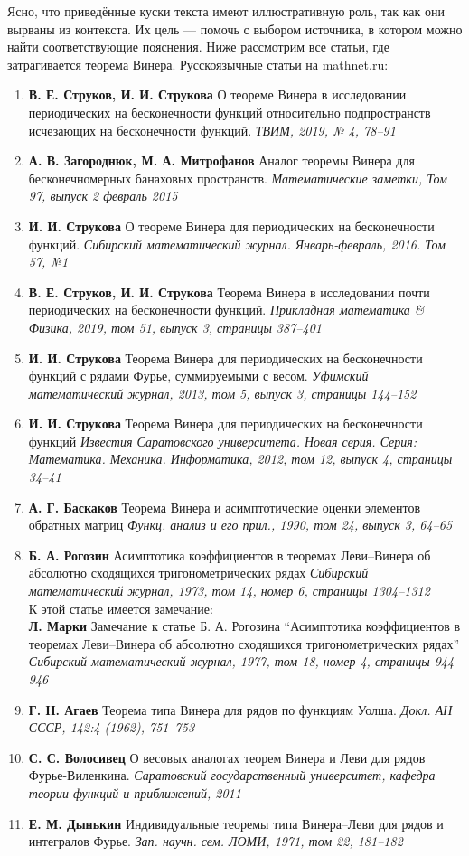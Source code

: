 \documentclass[12pt]{extarticle}
\theoremstyle{definition}
\begin{document}
  	 Ясно, что приведённые куски текста имеют иллюстративную роль, так как они вырваны из контекста. Их цель — помочь с выбором источника, в котором можно найти соответствующие пояснения. Ниже рассмотрим все статьи, где затрагивается теорема Винера. Русскоязычные статьи на mathnet.ru:
  	\begin{enumerate}
  		\item \textbf{В. Е. Струков, И. И. Струкова} О теореме Винера в исследовании периодических на бесконечности функций относительно подпространств исчезающих на бесконечности функций. \textit{ТВИМ, 2019, № 4, 78–91}
		\item \textbf{А. В. Загороднюк, М. А. Митрофанов} Аналог теоремы Винера для бесконечномерных банаховых пространств. \textit{Математические заметки, Том 97, выпуск 2 февраль 2015}
		\item \textbf{И. И. Струкова} О теореме Винера для периодических на бесконечности функций. \textit{Сибирский математический журнал. Январь-февраль, 2016. Том 57, №1}
		\item \textbf{В. Е. Струков, И. И. Струкова} Теорема Винера в исследовании почти периодических на бесконечности функций. \textit{Прикладная математика \& Физика, 2019, том 51, выпуск 3, страницы 387–401}
		\item \textbf{И. И. Струкова} Теорема Винера для периодических на бесконечности функций с рядами Фурье, суммируемыми с весом. \textit{Уфимский математический журнал, 2013, том 5, выпуск 3, страницы 144–152}
		\item \textbf{И. И. Струкова} Теорема Винера для периодических на бесконечности функций \textit{Известия Саратовского университета. Новая серия. Серия: Математика. Механика. Информатика, 2012, том 12, выпуск 4, страницы 34–41}
		\item \textbf{А. Г. Баскаков} Теорема Винера и асимптотические оценки элементов обратных матриц \textit{Функц.
			анализ и его прил., 1990, том 24, выпуск 3, 64–65}
		\item \textbf{Б. А. Рогозин} Асимптотика коэффициентов в теоремах Леви–Винера об абсолютно сходящихся тригонометрических рядах \textit{Сибирский математический журнал, 1973, том 14, номер 6, страницы 1304–1312}\\
		 К этой статье имеется замечание:\\ \textbf{Л. Марки} Замечание к статье Б. А. Рогозина “Асимптотика коэффициентов в теоремах Леви–Винера об абсолютно сходящихся тригонометрических рядах” \textit{Сибирский математический журнал, 1977, том 18, номер 4, страницы 944–946}
		 \item \textbf{Г. Н. Агаев} Теорема типа Винера для рядов по функциям Уолша. \textit{Докл. АН СССР, 142:4 (1962), 751–753}
		 \item \textbf{С. С. Волосивец} О весовых аналогах теорем Винера и Леви для рядов Фурье-Виленкина. \textit{Саратовский государственный университет, кафедра теории функций и приближений, 2011}
		 \item \textbf{Е. М. Дынькин} Индивидуальные теоремы типа Винера–Леви для рядов и интегралов Фурье. \textit{Зап. научн. сем. ЛОМИ, 1971, том 22, 181–182}
  	\end{enumerate}
\end{document}
